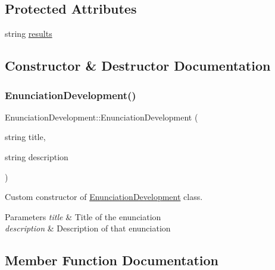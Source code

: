\subsection*{Protected Attributes}
\begin{DoxyCompactItemize}
\item 
string \hyperlink{class_enunciation_development_abc152492be3a1049b84b581022f0bf6f}{results}
\end{DoxyCompactItemize}


\subsection{Constructor \& Destructor Documentation}
\mbox{\label{class_enunciation_development_a8846729f4e511003b416a58cf580c9ff}} 
\subsubsection{\texorpdfstring{Enunciation\+Development()}{EnunciationDevelopment()}}
{\footnotesize\ttfamily Enunciation\+Development\+::\+Enunciation\+Development (\begin{DoxyParamCaption}\item[{string}]{title,  }\item[{string}]{description }\end{DoxyParamCaption})}



Custom constructor of \hyperlink{class_enunciation_development}{Enunciation\+Development} class. 


\begin{DoxyParams}{Parameters}
{\em title} & Title of the enunciation \\
\hline
{\em description} & Description of that enunciation \\
\hline
\end{DoxyParams}


\subsection{Member Function Documentation}
\mbox{\label{class_enunciation_development_a5480d39ba25c6fac36d07d3aad6b6de9}} 
